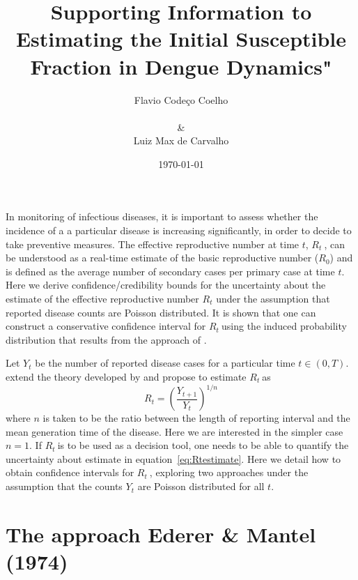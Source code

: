 \documentclass[12pt]{article}
\title{
Supporting Information to Estimating the Initial Susceptible Fraction in Dengue Dynamics"
}
\author{Flavio Code\c{c}o Coelho \\
\\
\& \\
Luiz Max de Carvalho \\
}
\date{\today}
\def \rr {$R_{t}\ $}
\begin{document}
                                  
% 

%
\maketitle

In monitoring of infectious diseases, it is important to assess whether the incidence of a a particular disease is increasing significantly, in order to decide to take preventive measures.
The effective reproductive number at time $t$, \rr, can be understood as a real-time estimate of the basic reproductive number ($R_{0}$) and is defined as the average number of secondary cases per primary case at time $t$.
Here we derive confidence/credibility bounds for the uncertainty about the estimate of the effective reproductive number $R_t$ under the assumption that reported disease counts are Poisson distributed.
It is shown that one can construct a conservative confidence interval for \rr using the induced probability distribution that results from the approach of \citet{mantel}.

Let $Y_t$ be the number of reported disease cases for a particular time $t \in (0, T)$.
\citet{nishiura} extend the theory developed by \citet{stallybrass} and propose to estimate \rr as
\begin{equation}
\label{eq:Rtestimate}
R_t = \left( \frac{Y_{t+1}}{Y_t}\right)^{1/n}
\end{equation}
where $n$ is taken to be the ratio between the length of reporting interval and the mean generation time of the disease.
Here we are interested in the simpler case $n=1$.
If \rr is to be used as a decision tool, one needs to be able to quantify the uncertainty about estimate in equation~\ref{eq:Rtestimate}. 
Here we detail how to obtain confidence intervals for \rr, exploring two approaches under the assumption that the counts $Y_t$ are Poisson distributed for all $t$.

\section*{The approach Ederer \& Mantel (1974)}
\end{document}
